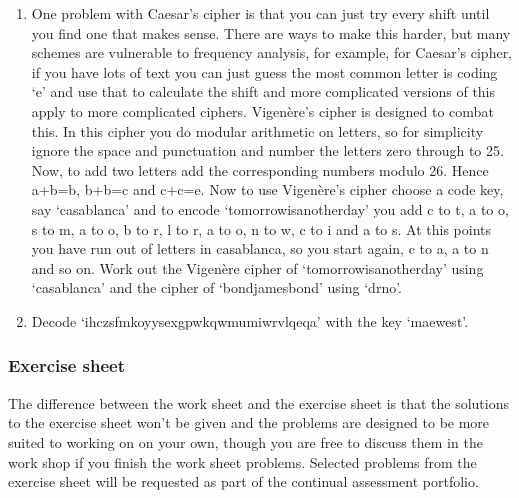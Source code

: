\documentclass[12pt]{article}
\begin{document}
\begin{enumerate}
\item One problem with Caesar's cipher is that you can just try every
  shift until you find one that makes sense. There are ways to make
  this harder, but many schemes are vulnerable to frequency analysis,
  for example, for Caesar's cipher, if you have lots of text you can
  just guess the most common letter is coding \lq{}e\rq{} and use that
  to calculate the shift and more complicated versions of this apply
  to more complicated ciphers. Vigen\`{e}re's cipher is designed to
  combat this. In this cipher you do modular arithmetic on letters, so
  for simplicity ignore the space and punctuation and number the
  letters zero through to 25. Now, to add two letters add the
  corresponding numbers modulo 26. Hence a+b=b, b+b=c and c+c=e. Now
  to use Vigen\`{e}re's cipher choose a code key, say
  \lq{}casablanca\rq{} and to encode \lq{}tomorrowisanotherday\rq{}
  you add c to t, a to o, s to m, a to o, b to r, l to r, a to o, n to
  w, c to i and a to s. At this points you have run out of letters in
  casablanca, so you start again, c to a, a to n and so on. Work out
  the Vigen\`{e}re cipher of \lq{}tomorrowisanotherday\rq{} using
  \lq{}casablanca\rq{} and the cipher of \lq{}bondjamesbond\rq{} using
  \lq{}drno\rq{}.

\item Decode \lq{}ihczsfmkoyysexgpwkqwmumiwrvlqeqa\rq{} with the key \lq{}maewest\rq{}.


\end{enumerate}

\subsubsection*{Exercise sheet}

The difference between the work sheet and the exercise sheet is that
the solutions to the exercise sheet won't be given and the problems
are designed to be more suited to working on on your own, though you
are free to discuss them in the work shop if you finish the work sheet
problems. Selected problems from the exercise sheet will be requested
as part of the continual assessment portfolio.
\end{document}
